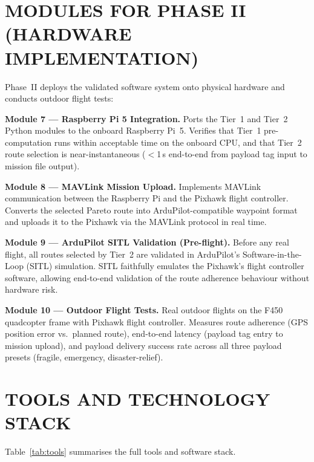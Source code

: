 \section{MODULES FOR PHASE II (HARDWARE IMPLEMENTATION)}
\label{sec:phase2modules}

Phase~II deploys the validated software system onto physical hardware and conducts
outdoor flight tests:

\textbf{Module 7 --- Raspberry Pi 5 Integration.} Ports the Tier~1 and Tier~2 Python
modules to the onboard Raspberry Pi~5. Verifies that Tier~1 pre-computation runs within
acceptable time on the onboard CPU, and that Tier~2 route selection is near-instantaneous
($<$1\,s end-to-end from payload tag input to mission file output).

\textbf{Module 8 --- MAVLink Mission Upload.} Implements MAVLink \cite{mavlink}
communication between the Raspberry Pi and the Pixhawk flight controller. Converts the
selected Pareto route into ArduPilot-compatible waypoint format and uploads it to the
Pixhawk via the MAVLink protocol in real time.

\textbf{Module 9 --- ArduPilot SITL Validation (Pre-flight).} Before any real flight,
all routes selected by Tier~2 are validated in ArduPilot's Software-in-the-Loop (SITL)
simulation. SITL faithfully emulates the Pixhawk's flight controller software, allowing
end-to-end validation of the route adherence behaviour without hardware risk.

\textbf{Module 10 --- Outdoor Flight Tests.} Real outdoor flights on the F450 quadcopter
frame with Pixhawk flight controller. Measures route adherence (GPS position error
vs.\ planned route), end-to-end latency (payload tag entry to mission upload), and
payload delivery success rate across all three payload presets (fragile, emergency,
disaster-relief).

\section{TOOLS AND TECHNOLOGY STACK}

Table~\ref{tab:tools} summarises the full tools and software stack.

